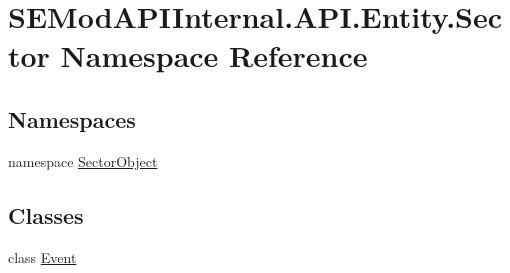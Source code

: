 \hypertarget{namespace_s_e_mod_a_p_i_internal_1_1_a_p_i_1_1_entity_1_1_sector}{}\section{S\+E\+Mod\+A\+P\+I\+Internal.\+A\+P\+I.\+Entity.\+Sector Namespace Reference}
\label{namespace_s_e_mod_a_p_i_internal_1_1_a_p_i_1_1_entity_1_1_sector}
\subsection*{Namespaces}
\begin{DoxyCompactItemize}
\item 
namespace \hyperlink{namespace_s_e_mod_a_p_i_internal_1_1_a_p_i_1_1_entity_1_1_sector_1_1_sector_object}{Sector\+Object}
\end{DoxyCompactItemize}
\subsection*{Classes}
\begin{DoxyCompactItemize}
\item 
class \hyperlink{class_s_e_mod_a_p_i_internal_1_1_a_p_i_1_1_entity_1_1_sector_1_1_event}{Event}
\end{DoxyCompactItemize}
